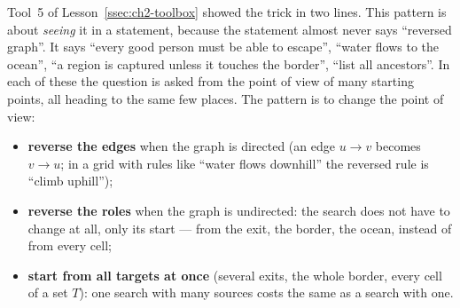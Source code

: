 Tool~5 of Lesson~\ref{ssec:ch2-toolbox} showed the trick in two lines. This pattern is about \emph{seeing} it in a statement, because the statement almost never says ``reversed graph''. It says ``every good person must be able to escape'', ``water flows to the ocean'', ``a region is captured unless it touches the border'', ``list all ancestors''. In each of these the question is asked from the point of view of many starting points, all heading to the same few places. The pattern is to change the point of view:
\begin{itemize}[leftmargin=*]
    \item \textbf{reverse the edges} when the graph is directed (an edge $u \to v$ becomes $v \to u$; in a grid with rules like ``water flows downhill'' the reversed rule is ``climb uphill'');
    \item \textbf{reverse the roles} when the graph is undirected: the search does not have to change at all, only its start --- from the exit, the border, the ocean, instead of from every cell;
    \item \textbf{start from all targets at once} (several exits, the whole border, every cell of a set $T$): one search with many sources costs the same as a search with one.
\end{itemize}

\begin{diagrambox}
\end{diagrambox}

